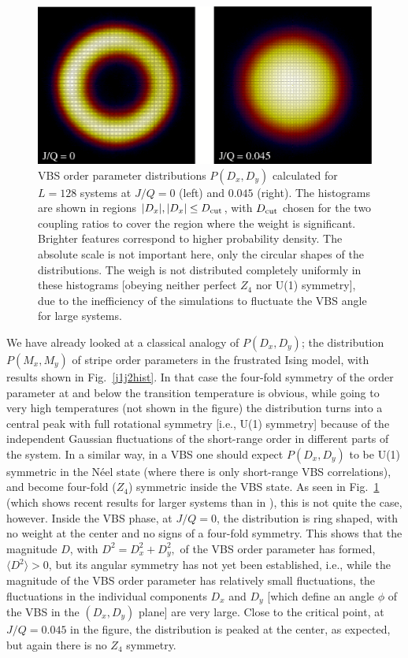 \documentclass[draft,numberedheadings]{aipproc}
\begin{document}
\begin{figure}
\includegraphics[width=12.2cm, clip]{vbhist2.eps}
\caption{VBS order parameter distributions $P(D_x,D_y)$ calculated for $L=128$ systems at $J/Q=0$ (left) and $0.045$ (right). The histograms are shown 
in regions $|D_x|,|D_x|\le D_{\rm cut}$, with $D_{\rm cut}$ chosen for the two coupling ratios to cover the region where the weight is significant. Brighter features 
correspond to higher probability density. The absolute scale is not important here, only the circular shapes of the distributions. The weigh is not 
distributed completely uniformly in these histograms [obeying neither perfect $Z_4$ nor U(1) symmetry], due to the inefficiency of the simulations to 
fluctuate the VBS angle for large systems.}
\label{vbhist}
\end{figure}

We have already looked at a classical analogy of $P(D_x,D_y)$; the distribution $P(M_x,M_y)$ of stripe order parameters in the frustrated Ising model, with 
results shown in Fig.~\ref{j1j2hist}. In that case the four-fold symmetry of the order parameter at and below the transition temperature is obvious, while going 
to very high temperatures (not shown in the figure) the distribution turns into a central peak with full rotational symmetry [i.e., U(1) symmetry] because of 
the independent Gaussian fluctuations of the short-range order in different parts of the system. In a similar way, in a VBS one should expect $P(D_x,D_y)$ 
to be U(1) symmetric in the N\'eel state (where there is only short-range VBS correlations), and become four-fold ($Z_4$) symmetric inside the VBS state. 
As seen in Fig.~\ref{vbhist} (which shows recent results for larger systems than in \cite{sandvik1,jiang2,lou1}), this is not quite the case, however. 
Inside the VBS phase, at $J/Q=0$, the distribution is ring shaped, with no weight at the center and no signs of a four-fold symmetry. This shows that the 
magnitude $D$, with $D^2=D_x^2+D_y^2,$ of the VBS order parameter has formed, $\langle D^2 \rangle >0$, but its angular symmetry has not yet been established, 
i.e., while the magnitude of the VBS order parameter has relatively small fluctuations, the fluctuations in the individual components $D_x$ and $D_y$ [which 
define an angle $\phi$ of the VBS in the $(D_x,D_y)$ plane] are very large. Close to the critical point, at $J/Q=0.045$ in the figure, the distribution 
is peaked at the center, as expected, but again there is no $Z_4$ symmetry.
\end{document}
